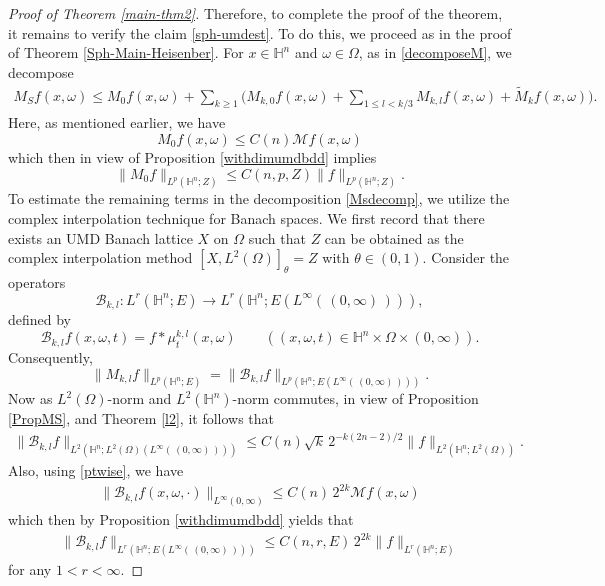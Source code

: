 \documentclass[11pt]{amsart}
\newcommand{\Ha}{\mathbb{H}^n}
\theoremstyle{definition}
\numberwithin{equation}{section}
\begin{document}
\begin{proof}[Proof of Theorem \ref{main-thm2}]
        Therefore, to complete the proof of the theorem, it remains to verify the claim \eqref{sph-umdest}. To do this, we proceed as in the proof of Theorem \ref{Sph-Main-Heisenber}. 
        For $x\in \Ha$ and $\omega\in\Omega$, as in \eqref{decomposeM}, we decompose
        \begin{align}
        \label{Msdecomp}
            M_Sf(x,\omega)\leq M_0f(x,\omega)+\sum_{k\ge 1}\big(M_{k,0}f(x,\omega)+\sum_{1\le l<k/3} M_{k,l}f
(x,\omega)+ \widetilde M_kf(x,\omega)\big).
        \end{align}
          Here, as mentioned earlier, we have 
          $$M_0f(x,\omega)\leq C(n) \mathcal{M}f(x,\omega)$$
          which then in view of Proposition \ref{withdimumdbdd} implies 
          \begin{equation}
              \label{umd-M0est}
              \|M_0f\|_{L^p(\Ha; Z)}\leq C(n,p,Z) \|f\|_{L^p(\Ha; Z)}.
          \end{equation}
         To estimate the remaining terms in the decomposition \eqref{Msdecomp}, we utilize the complex interpolation technique for Banach spaces.  We first record that there exists an UMD Banach lattice $X$ on $\Omega$ such that $Z$ can be obtained as the complex interpolation method 
         $[X, L^2(\Omega)]_{\theta}=Z$ with $\theta\in (0,1).$
         Consider the operators 
         $$\mathcal{B}_{k, l} :  L^r(\Ha; E) \to L^r(\Ha; E(L^\infty(\,(0, \infty)\,))),$$
defined by $$\mathcal{B}_{k,l}f(x,\omega,t) = f\ast \mu^{k, l}_{t}(x,\omega) \quad\quad ((x,\omega,t)\in \Ha\times \Omega\times (0,\infty)).$$
Consequently, $$\| M_{k,l}f\|_{L^p(\Ha; E)}=\|\mathcal{B}_{k,l}f\|_{L^p(\Ha; E(L^\infty(\,(0, \infty)\,)))}.$$
Now as $L^2(\Omega)$-norm and $L^2(\Ha)$-norm commutes, in view of Proposition \ref{PropMS}, and Theorem \ref{l2}, it follows that 
\begin{align}
\label{bkl-L2-umd-est}
  \|\mathcal{B}_{k,l}f\|_{L^2(\Ha; L^2(\Omega)(L^\infty(\,(0, \infty)\,)))}  \leq C(n) \sqrt{k}\,2^{-k(2n-2)/2}\|f\|_{L^2(\Ha; L^2(\Omega))}.
\end{align}
Also, using \eqref{ptwise}, we have 
\begin{align*}
    \| \mathcal{B}_{k,l}f(x,\omega,\cdot)\|_{L^{\infty}(0,\infty)}\leq C(n)\, 2^{2k} \mathcal{M}f(x,\omega)
\end{align*}
which then by Proposition \ref{withdimumdbdd} yields that
\begin{align}
\label{bkl-Lr-umd-est}
    \|\mathcal{B}_{k,l}f\|_{L^r(\Ha; E(L^\infty(\,(0, \infty)\,)))}\leq C(n, r, E)\, 2^{2k} \|f\|_{L^r(\Ha; E)}
\end{align}
for any $1<r<\infty.$ 


\end{proof}
\end{document}
